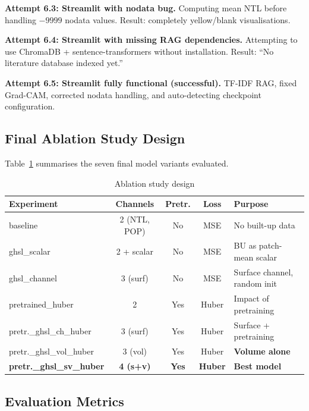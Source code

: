 \documentclass[12pt,a4paper]{article}
\begin{document}
\textbf{Attempt 6.3: Streamlit with nodata bug.} Computing mean NTL before handling $-9999$ nodata values. Result: completely yellow/blank visualisations.

\textbf{Attempt 6.4: Streamlit with missing RAG dependencies.} Attempting to use ChromaDB + sentence-transformers without installation. Result: ``No literature database indexed yet.''

\textbf{Attempt 6.5: Streamlit fully functional (successful).} TF-IDF RAG, fixed Grad-CAM, corrected nodata handling, and auto-detecting checkpoint configuration.

\subsection{Final Ablation Study Design}
\label{subsec:ablation_design}

Table~\ref{tab:ablation_design} summarises the seven final model variants evaluated.

\begin{table}[H]
\centering
\caption{Ablation study design}
\label{tab:ablation_design}
\begin{tabular}{@{}p{5.5cm}cccp{3.5cm}@{}}
\toprule
\textbf{Experiment} & \textbf{Channels} & \textbf{Pretr.} & \textbf{Loss} & \textbf{Purpose} \\
\midrule
baseline & 2 (NTL, POP) & No & MSE & No built-up data \\
ghsl\_scalar & 2 + scalar & No & MSE & BU as patch-mean scalar \\
ghsl\_channel & 3 (surf) & No & MSE & Surface channel, random init \\
pretrained\_huber & 2 & Yes & Huber & Impact of pretraining \\
pretr.\_ghsl\_ch\_huber & 3 (surf) & Yes & Huber & Surface + pretraining \\
pretr.\_ghsl\_vol\_huber & 3 (vol) & Yes & Huber & \textbf{Volume alone} \\
\textbf{pretr.\_ghsl\_sv\_huber} & \textbf{4 (s+v)} & \textbf{Yes} & \textbf{Huber} & \textbf{Best model} \\
\bottomrule
\end{tabular}
\end{table}

\subsection{Evaluation Metrics}
\label{subsec:metrics}
\end{document}
